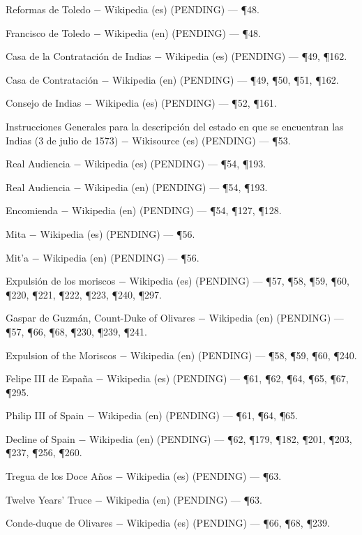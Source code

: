 \documentclass{book}
\begin{document}
\noindent Reformas de Toledo \(-\) Wikipedia (es) (PENDING) --- \P48.

\noindent Francisco de Toledo \(-\) Wikipedia (en) (PENDING) --- \P48.

\noindent Casa de la Contratación de Indias \(-\) Wikipedia (es) (PENDING) --- \P49, \P162.

\noindent Casa de Contratación \(-\) Wikipedia (en) (PENDING) --- \P49, \P50, \P51, \P162.

\noindent Consejo de Indias \(-\) Wikipedia (es) (PENDING) --- \P52, \P161.

\noindent Instrucciones Generales para la descripción del estado en que se encuentran las Indias (3 de julio de 1573) \(-\) Wikisource (es) (PENDING) --- \P53.

\noindent Real Audiencia \(-\) Wikipedia (es) (PENDING) --- \P54, \P193.

\noindent Real Audiencia \(-\) Wikipedia (en) (PENDING) --- \P54, \P193.

\noindent Encomienda \(-\) Wikipedia (en) (PENDING) --- \P54, \P127, \P128.

\noindent Mita \(-\) Wikipedia (es) (PENDING) --- \P56.

\noindent Mit'a \(-\) Wikipedia (en) (PENDING) --- \P56.

\noindent Expulsión de los moriscos \(-\) Wikipedia (es) (PENDING) --- \P57, \P58, \P59, \P60, \P220, \P221, \P222, \P223, \P240, \P297.

\noindent Gaspar de Guzmán, Count-Duke of Olivares \(-\) Wikipedia (en) (PENDING) --- \P57, \P66, \P68, \P230, \P239, \P241.

\noindent Expulsion of the Moriscos \(-\) Wikipedia (en) (PENDING) --- \P58, \P59, \P60, \P240.

\noindent Felipe III de España \(-\) Wikipedia (es) (PENDING) --- \P61, \P62, \P64, \P65, \P67, \P295.

\noindent Philip III of Spain \(-\) Wikipedia (en) (PENDING) --- \P61, \P64, \P65.

\noindent Decline of Spain \(-\) Wikipedia (en) (PENDING) --- \P62, \P179, \P182, \P201, \P203, \P237, \P256, \P260.

\noindent Tregua de los Doce Años \(-\) Wikipedia (es) (PENDING) --- \P63.

\noindent Twelve Years' Truce \(-\) Wikipedia (en) (PENDING) --- \P63.

\noindent Conde-duque de Olivares \(-\) Wikipedia (es) (PENDING) --- \P66, \P68, \P239.
\end{document}
